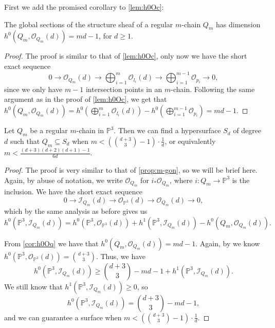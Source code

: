 First we add the promised corollary to \cref{lem:h0Oc}:
\begin{corollary}\label{cor:h0Oq}
    The global sections of the structure sheaf of a regular $m$-chain $Q_m$ has dimension $h^0(Q_m, \mathcal{O}_{Q_m}(d)) = md - 1$, for $d \geq 1$.
\end{corollary}
\begin{proof}
    The proof is similar to that of \cref{lem:h0Oc}, only now we have the short exact sequence
    \[0 \to \mathcal{O}_{Q_m}(d) \to \bigoplus_{i=1}^m \mathcal{O}_{l_i}(d) \to \bigoplus_{i=1}^{m-1} \mathcal{O}_{p_i} \to 0,\]
    since we only have $m-1$ intersection points in an $m$-chain. Following the same argument as in the proof of \cref{lem:h0Oc}, we get that $h^0(Q_m, \mathcal{O}_{Q_m}(d)) = h^0(\bigoplus_{i=1}^m \mathcal{O}_{l_i}(d)) - h^0(\bigoplus_{i=1}^{m-1} \mathcal{O}_{p_i}) = md - 1$.
\end{proof}

\begin{proposition}\label{prop:n-chain}
    Let $Q_m$ be a regular $m$-chain in $\mathbb{P}^3$. Then we can find a hypersurface $S_d$ of degree $d$ such that $Q_m \subseteq S_d$ when $m < (\binom{d+3}{3}-1) \cdot \frac{1}{d}$, or equivalently $m < \frac{(d+3)(d+2)(d+1)-1}{6d}$.
\end{proposition}

\begin{proof}
    The proof is very similar to that of \cref{prop:m-gon}, so we will be brief here. Again, by abuse of notation, we write $\mathcal{O}_{Q_m}$ for $i_* \mathcal{O}_{Q_m}$, where $i: Q_m \to \mathbb{P}^3$ is the inclusion. We have the short exact sequence
    \[0 \to \mathcal{I}_{Q_m}(d) \to \mathcal{O}_{\mathbb{P}^3}(d) \to \mathcal{O}_{Q_m}(d) \to 0,\]
    which by the same analysis as before gives us 
    \[h^0(\mathbb{P}^3, \mathcal{I}_{Q_m}(d)) = h^0(\mathbb{P}^3, \mathcal{O}_{\mathbb{P}^3}(d)) + h^1(\mathbb{P}^3, \mathcal{I}_{Q_m}(d)) - h^0(Q_m, \mathcal{O}_{Q_m}(d)).\]

    From \cref{cor:h0Oq} we have that $h^0(Q_m, \mathcal{O}_{Q_m}(d)) = md - 1$. Again, by \cite[Corollary 20.26]{EO25} we know $h^0(\mathbb{P}^3, \mathcal{O}_{\mathbb{P}^3}(d)) = \binom{d+3}{3}$.
    Thus, we have
    \[h^0(\mathbb{P}^3, \mathcal{I}_{Q_m}(d)) \geq \binom{d+3}{3}-md-1 + h^1(\mathbb{P}^3, \mathcal{I}_{Q_m}(d)).\]
    We still know that $h^1(\mathbb{P}^3, \mathcal{I}_{Q_m}(d)) \geq 0$, so 
    \[h^0(\mathbb{P}^3, \mathcal{I}_{Q_m}(d)) = \binom{d+3}{3}-md-1,\]
    and we can guarantee a surface when $m < (\binom{d+3}{3}-1) \cdot \frac{1}{d}$.
\end{proof}

